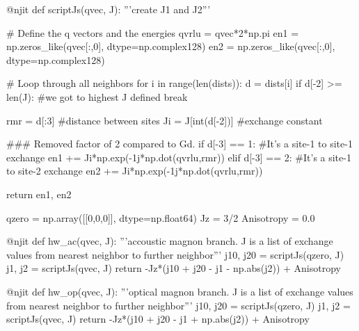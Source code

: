 \documentclass[a4paper,12pt]{article}
\begin{document}
            \begin{python}
                @njit
                def scriptJs(qvec, J):
                    '''create J1 and J2'''
                    
                    # Define the q vectors and the energies
                    qvrlu = qvec*2*np.pi
                    en1 = np.zeros_like(qvec[:,0], dtype=np.complex128)
                    en2 = np.zeros_like(qvec[:,0], dtype=np.complex128)
                    
                    # Loop through all neighbors
                    for i in range(len(dists)):
                        d = dists[i]
                        if d[-2] >= len(J):  #we got to highest J defined
                            break
                        
                        rmr = d[:3] #distance between sites
                        Ji = J[int(d[-2])]  #exchange constant
                        
                        ### Removed factor of 2 compared to Gd.
                        if d[-3] == 1: #It's a site-1 to site-1 exchange
                            en1 += Ji*np.exp(-1j*np.dot(qvrlu,rmr))
                        elif d[-3] == 2: #It's a site-1 to site-2 exchange
                            en2 += Ji*np.exp(-1j*np.dot(qvrlu,rmr))
                        
                    return en1, en2

                qzero = np.array([[0,0,0]], dtype=np.float64)
                Jz = 3/2
                Anisotropy = 0.0

                @njit
                def hw_ac(qvec, J):
                    '''accoustic magnon branch. J is a list of exchange values 
                    from nearest neighbor to further neighbor'''
                    j10, j20 = scriptJs(qzero, J)
                    j1, j2 = scriptJs(qvec, J)
                    return -Jz*(j10 + j20 - j1 - np.abs(j2)) + Anisotropy
                    
                @njit
                def hw_op(qvec, J):
                    '''optical magnon branch. J is a list of exchange values 
                    from nearest neighbor to further neighbor'''
                    j10, j20 = scriptJs(qzero, J)
                    j1, j2 = scriptJs(qvec, J)
                    return -Jz*(j10 + j20 - j1 + np.abs(j2)) + Anisotropy
            \end{python}
\end{document}
